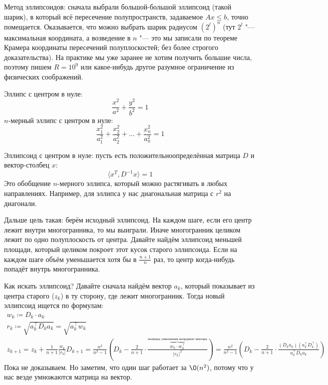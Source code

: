 	Метод эллипсоидов: сначала выбрали большой-большой эллипсоид (такой шарик),
	в который всё пересечение полупространств, задаваемое $A x \le b$, точно помещается.
	Оказывается, что можно выбрать шарик радиусом $(2 ^ l)^n$ (тут $2^l$ "--- максимальная координата,
	а возведение в $n$ "--- это мы записали по теореме Крамера координаты пересечений полуплоскостей;
	без более строгого доказательства).
	На практике мы уже заранее не хотим получить большие числа, поэтому пишем $R=10^9$
	или какое-нибудь другое разумное ограничение из физических соображений.

	\begin{Def}
		Эллипс с центром в нуле:
		\[
			\frac{x^2}{a^2} + \frac{y^2}{b^2} = 1
		\]
		$n$-мерный эллипс с центром в нуле:
		\[
			\frac{x_1^2}{a_1^2} + \frac{x_2^2}{a_2^2} + \dots + \frac{x_n^2}{a_n^2} = 1
		\]

		Эллипсоид с центром в нуле: пусть есть положительноопределённая матрица $D$ и вектор-столбец $x$:
		\[
			\langle x^T, D^{-1} x \rangle = 1
		\]
		Это обобщение $n$-мерного эллипса, который можно растягивать в любых направлениях.
		Например, для эллипса у нас диагональная матрица с $r^2$ на диагонали.
	\end{Def}

	Дальше цель такая: берём исходный эллипсоид.
	На каждом шаге, если его центр лежит внутри многогранника, то мы выиграли.
	Иначе многогранник целиком лежит по одно полуплоскость от центра.
	Давайте найдём эллипсоид меньшей площади, который целиком покроет этот кусок старого эллипсоида.
	Если на каждом шаге объём уменьшается хотя бы в $\frac{n+1}{n}$ раз, то центр когда-нибудь попадёт внутрь многогранника.

	Как искать эллипсоид?
	Давайте сначала найдём вектор $a_k$, который показывает из центра старого ($z_k$) в ту сторону, где лежит многогранник.
	Тогда новый эллипсоид ищется по формулам:
	\begin{gather*}
		w_k \coloneq D_k \cdot a_k \\
		r_k \coloneq \sqrt{a_k^{\top} D_k a_k} = \sqrt{a_k^{\top} w_k} \\
		z_{k+1} = z_k + \frac{1}{n+1} \frac{w_k}{|r_k|}
		D_{k+1} = \frac{n^2}{n^2 - 1}\left(D_k - \frac{2}{n+1}\cdot \frac{\overbrace{w_k \cdot w_k^{\top}}^{\text{матрица умножения координат вектора}}}{|r_k|^2} \right) =
			\frac{n^2}{n^2-1}\left(D_k-\frac{2}{n+1}\cdot\frac{(D_ka_k)(a_k^\top D_k^\top)}{a_k^\top D_k a_k}\right)
	\end{gather*}
	Пока не доказываем.
	Но заметим, что один шаг работает за $\O(n^2)$, потому что у нас везде умножаются матрица на вектор.

